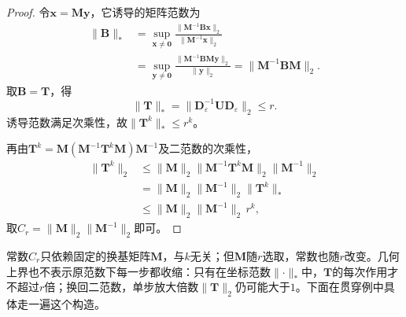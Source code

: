 \begin{proof}
令$\bm x=\bm M\bm y$，它诱导的矩阵范数为
\[
\begin{aligned}
 \lVert\bm B\rVert_*
 &=\sup_{\bm x\neq\bm0}\frac{\lVert\bm M^{-1}\bm B\bm x\rVert_2}{\lVert\bm M^{-1}\bm x\rVert_2}\\
 &=\sup_{\bm y\neq\bm0}\frac{\lVert\bm M^{-1}\bm B\bm M\bm y\rVert_2}{\lVert\bm y\rVert_2}
 =\lVert\bm M^{-1}\bm B\bm M\rVert_2 .
\end{aligned}
\]
取$\bm B=\bm T$，得
\[
 \lVert\bm T\rVert_*=\lVert\bm D_\varepsilon^{-1}\bm U\bm D_\varepsilon\rVert_2\leq r .
\]
诱导范数满足次乘性，故$\lVert\bm T^k\rVert_*\leq r^k$。

再由$\bm T^k=\bm M(\bm M^{-1}\bm T^k\bm M)\bm M^{-1}$及二范数的次乘性，
\[
 \begin{aligned}
 \lVert\bm T^k\rVert_2&\leq\lVert\bm M\rVert_2\lVert\bm M^{-1}\bm T^k\bm M\rVert_2\lVert\bm M^{-1}\rVert_2\\
 &=\lVert\bm M\rVert_2\lVert\bm M^{-1}\rVert_2\lVert\bm T^k\rVert_*\\
 &\leq\lVert\bm M\rVert_2\lVert\bm M^{-1}\rVert_2\,r^k ,
 \end{aligned}
\]
取$C_r=\lVert\bm M\rVert_2\lVert\bm M^{-1}\rVert_2$即可。
\end{proof}
常数$C_r$只依赖固定的换基矩阵$\bm M$，与$k$无关；但$\bm M$随$r$选取，常数也随$r$改变。几何上界也不表示原范数下每一步都收缩：只有在坐标范数$\lVert\cdot\rVert_*$中，$\bm T$的每次作用才不超过$r$倍；换回二范数，单步放大倍数$\lVert\bm T\rVert_2$仍可能大于$1$。下面在贯穿例中具体走一遍这个构造。

